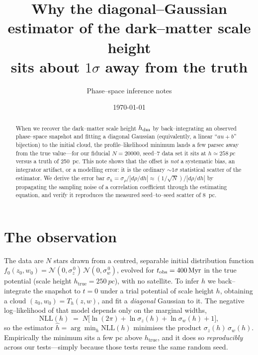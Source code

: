\documentclass[11pt]{article}
\title{Why the diagonal--Gaussian estimator of the dark--matter scale height\\
sits about $1\sigma$ away from the truth}
\author{Phase--space inference notes}
\date{\today}
\newcommand{\htrue}{h_{\mathrm{true}}}
\newcommand{\hhat}{\hat h}
\newcommand{\dz}{\sigma_z}
\newcommand{\dw}{\sigma_w}
\begin{document}
\maketitle

\begin{abstract}
When we recover the dark--matter scale height $h_{\rm dm}$ by back--integrating an
observed phase--space snapshot and fitting a diagonal Gaussian (equivalently, a
linear ``$a u + b$'' bijection) to the initial cloud, the profile--likelihood
minimum lands a few parsec away from the true value---for our fiducial
$N=\num{20000}$, seed--7 data set it sits at $h\simeq\SI{258}{pc}$ versus a truth
of \SI{250}{pc}. This note shows that the offset is \emph{not} a systematic
bias, an integrator artifact, or a modelling error: it is the ordinary
$\sim\!1\sigma$ statistical scatter of the estimator. We derive the error bar
$\sigma_h=\sigma_\rho/|d\rho/dh|\approx(1/\sqrt N)/|d\rho/dh|$ by propagating the
sampling noise of a correlation coefficient through the estimating equation, and
verify it reproduces the measured seed--to--seed scatter of \SI{8}{pc}.
\end{abstract}

\section{The observation}
The data are $N$ stars drawn from a centred, separable initial distribution
function $f_0(z_0,w_0)=\mathcal N(0,\dz^{\,0})\,\mathcal N(0,\dw^{\,0})$, evolved
for $t_{\rm obs}=\SI{400}{Myr}$ in the true potential (scale height $\htrue=\SI{250}{pc}$),
with no satellite. To infer $h$ we back--integrate the snapshot to $t=0$ under a
trial potential of scale height $h$, obtaining a cloud $(z_0,w_0)=T_h(z,w)$, and
fit a \emph{diagonal} Gaussian to it. The negative log--likelihood of that model
depends only on the marginal widths,
\begin{equation}
  \mathrm{NLL}(h) \;=\; N\Big[\ln(2\pi) + \ln\dz(h) + \ln\dw(h) + 1\Big],
  \label{eq:nll}
\end{equation}
so the estimator $\hhat=\arg\min_h \mathrm{NLL}(h)$ minimises the product
$\dz(h)\,\dw(h)$. Empirically the minimum sits a few pc above $\htrue$, and it
does so \emph{reproducibly} across our tests---simply because those tests reuse
the same random seed.
\end{document}
